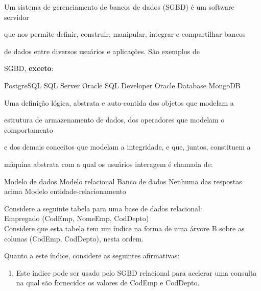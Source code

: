 \documentclass[12pt, addpoints]{exam}
\begin{document}
    \begin{questions}

    \newpage
    \question

Um sistema de gerenciamento de bancos de dados (SGBD) é um software servidor

que nos permite definir, construir, manipular, integrar e compartilhar bancos

de dados entre diversos usuários e aplicações. São exemplos de

SGBD, \textbf{exceto}:
\begin{choices}
\choice PostgreSQL
\choice SQL Server
\choice Oracle SQL Developer
\choice Oracle Database
\choice MongoDB
\end{choices}

\question

Uma definição lógica, abstrata e auto-contida dos objetos que modelam a

estrutura de armazenamento de dados, dos operadores que modelam o comportamento

e dos demais conceitos que modelam a integridade, e que, juntos, constituem a

máquina abstrata com a qual os usuários interagem é chamada de:


\begin{choices}
\choice Modelo de dados
\choice Modelo relacional
\choice Banco de dados
\choice Nenhuma das respostas acima
\choice Modelo entidade-relacionamento
\end{choices}

\question

Considere a seguinte tabela para uma base de dados relacional:\\

Empregado (CodEmp, NomeEmp, CodDepto)\\

Considere que esta tabela tem um índice na forma de uma árvore B sobre as colunas (CodEmp, CodDepto), nesta ordem.

Quanto a este índice, considere as seguintes afirmativas:

\begin{enumerate}

    \item Este índice pode ser usado pelo SGBD relacional para acelerar uma consulta na qual são fornecidos os valores de CodEmp e CodDepto.


\end{enumerate}
\end{questions}
\end{document}
